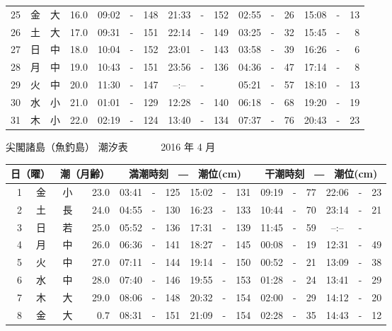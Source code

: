 \documentclass[12pt.a4j]{jsarticle}
\begin{document}
\begin{center}
\begin{table}[ht]
\begin{tabular}{|rc|cr|ccrccr|ccrccr|}
25 & 金 & 大 & 16.0 &  09:02 &-& 148  &  21:33 &-& 152  &   02:55 &-&  26  &   15:08 &-&  13  \\
26 & 土 & 大 & 17.0 &  09:31 &-& 151  &  22:14 &-& 149  &   03:25 &-&  32  &   15:45 &-&   8  \\
27 & 日 & 中 & 18.0 &  10:04 &-& 152  &  23:01 &-& 143  &   03:58 &-&  39  &   16:26 &-&   6  \\
28 & 月 & 中 & 19.0 &  10:43 &-& 151  &  23:56 &-& 136  &   04:36 &-&  47  &   17:14 &-&   8  \\
29 & 火 & 中 & 20.0 &  11:30 &-& 147  &  --:-- &-&     &   05:21 &-&  57  &   18:10 &-&  13  \\
30 & 水 & 小 & 21.0 &  01:01 &-& 129  &  12:28 &-& 140  &   06:18 &-&  68  &   19:20 &-&  19  \\
31 & 木 & 小 & 22.0 &  02:19 &-& 124  &  13:40 &-& 134  &   07:37 &-&  76  &   20:43 &-&  23  \\
   \hline
   \end{tabular}
\end{table}
\newpage
 {\LARGE 尖閣諸島（魚釣島）  潮汐表　　　}
 {\large 2016 年  4 月}\\
 \begin{table}[ht]
    \begin{tabular}{|rc|cr|ccrccr|ccrccr|}
    \hline
    \multicolumn{2}{|c|}{日（曜）} & \multicolumn{2}{c|}{潮（月齢）} & \multicolumn{6}{c|}{満潮時刻　―　潮位(cm)} & \multicolumn{6}{c|}{干潮時刻　―　潮位(cm)} \\
 \hline
 1 & 金 & 小 & 23.0 &  03:41 &-& 125  &  15:02 &-& 131  &   09:19 &-&  77  &   22:06 &-&  23  \\
 2 & 土 & 長 & 24.0 &  04:55 &-& 130  &  16:23 &-& 133  &   10:44 &-&  70  &   23:14 &-&  21  \\
 3 & 日 & 若 & 25.0 &  05:52 &-& 136  &  17:31 &-& 139  &   11:45 &-&  59  &   --:-- &-&     \\
 4 & 月 & 中 & 26.0 &  06:36 &-& 141  &  18:27 &-& 145  &   00:08 &-&  19  &   12:31 &-&  49  \\
 5 & 火 & 中 & 27.0 &  07:11 &-& 144  &  19:14 &-& 150  &   00:52 &-&  21  &   13:09 &-&  38  \\
 6 & 水 & 中 & 28.0 &  07:40 &-& 146  &  19:55 &-& 153  &   01:28 &-&  24  &   13:41 &-&  29  \\
 7 & 木 & 大 & 29.0 &  08:06 &-& 148  &  20:32 &-& 154  &   02:00 &-&  29  &   14:12 &-&  20  \\
 8 & 金 & 大 &  0.7 &  08:31 &-& 151  &  21:09 &-& 154  &   02:28 &-&  35  &   14:43 &-&  12  \\

\end{tabular}
\end{table}
\end{center}
\end{document}
